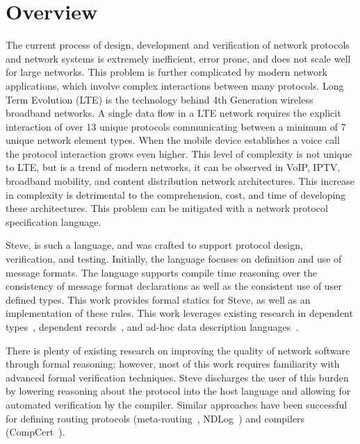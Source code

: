 \section{Overview}

The current process of design, development and verification of network protocols
and network systems is extremely inefficient, error prone, and does not scale
well for large networks. This problem is further complicated by modern network
applications, which
involve complex interactions between many protocols. Long Term
Evolution (LTE) is the technology behind 4th Generation wireless broadband
networks. A single data flow in a LTE network requires the explicit interaction
of over 13 unique protocols communicating between a minimum of 7 unique network
element types. When the mobile device establishes a voice call the protocol
interaction grows even higher. This level of complexity is not unique to LTE,
but is a trend of modern networks, it can be observed in VoIP, IPTV, broadband
mobility, and content distribution network architectures. This increase in
complexity is detrimental to the comprehension, cost, and time of developing
these architectures.
This problem can be mitigated with a network protocol specification language.

Steve, is such a language, and was crafted to support protocol design,
verification, and testing. Initially, the language focuses on definition and use
of message formats. The language supports compile time reasoning over the
consistency of message format declarations as well as the consistent use of
user defined types. This work provides formal statics for Steve, as
well as an implementation of these rules.
This work leverages existing research in dependent types~\cite{dep_types}, 
dependent records~\cite{dep_rec}, and
ad-hoc data description languages~\cite{next_700_ddl}.

There is plenty of existing research on improving the quality of network
software through formal reasoning; however, most of this work requires 
familiarity with advanced formal verification techniques. Steve discharges the
user of this burden by lowering reasoning about the protocol into the host 
language and allowing for automated verification by the compiler. Similar
approaches have been successful for defining routing protocols 
(meta-routing~\cite{meta_routing}, NDLog~\cite{ndlog}) and compilers
(CompCert~\cite{compcert}).
